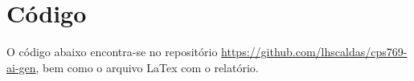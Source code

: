 \documentclass[12 pt]{article}
\begin{document}
\section*{Código}

O código abaixo encontra-se no repositório \href{https://github.com/lhscaldas/cps769-ai-gen}{https://github.com/lhscaldas/cps769-ai-gen}, bem como o arquivo LaTex com o relatório.



\end{document}
